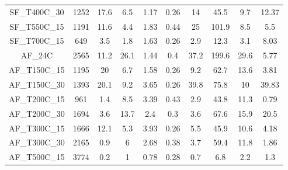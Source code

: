 \documentclass[review]{elsarticle}
\begin{document}
\begin{landscape}
\begin{table}[htbp]
\begin{tabular}{cccccccccc}
		SF\_T400C\_30 & 1252  & 17.6  & 6.5   & 1.17  & 0.26  & 14    & 45.5  & 9.7   & 12.37 \\
		SF\_T550C\_15 & 1191  & 11.6  & 4.4   & 1.83  & 0.44  & 25    & 101.9 & 8.5   & 5.5 \\
		SF\_T700C\_15 & 649   & 3.5   & 1.8   & 1.63  & 0.26  & 2.9   & 12.3  & 3.1   & 8.03 \\
		AF\_24C & 2565  & 11.2  & 26.1  & 1.44  & 0.4   & 37.2  & 199.6 & 29.6  & 5.77 \\
		AF\_T150C\_15 & 1195  & 20    & 6.7   & 1.58  & 0.26  & 9.2   & 62.7  & 13.6  & 3.81 \\
		AF\_T150C\_30 & 1393  & 20.1  & 9.2   & 3.65  & 0.26  & 39.8  & 75.8  & 10    & 39.83 \\
		AF\_T200C\_15 & 961   & 1.4   & 8.5   & 3.39  & 0.43  & 2.9   & 43.8  & 11.3  & 0.79 \\
		AF\_T200C\_30 & 1694  & 3.6   & 13.7  & 2.4   & 0.3   & 3.6   & 67.6  & 15.9  & 20.5 \\
		AF\_T300C\_15 & 1666  & 12.1  & 5.3   & 3.93  & 0.26  & 5.5   & 45.9  & 10.6  & 4.18 \\
		AF\_T300C\_30 & 2165  & 0.9   & 6     & 2.68  & 0.38  & 3.7   & 59.4  & 11.8  & 1.86 \\
		AF\_T500C\_15 & 3774  & 0.2   & 1     & 0.78  & 0.28  & 0.7   & 6.8   & 2.2   & 1.3 \\
		\bottomrule
	\end{tabular}%
	\label{Tab4}%
\end{table}%

\end{landscape}
\end{document}

